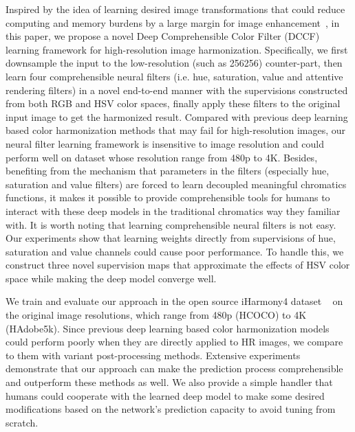 \documentclass[runningheads]{llncs}
\begin{document}
Inspired by the idea of learning desired image transformations that could reduce computing and memory burdens by a large margin for image enhancement~\cite{gharbi2017deep}, in this paper, 
    we propose a novel Deep Comprehensible Color Filter (DCCF) learning framework for high-resolution image harmonization.
    Specifically, we first downsample the input to the low-resolution (such as 256256) counter-part, then learn four comprehensible neural filters (i.e. hue, saturation, value and attentive rendering filters) in a novel end-to-end manner with the supervisions constructed from both RGB and HSV color spaces, finally apply these filters to the original input image to get the harmonized result.
    Compared with previous deep learning based color harmonization methods that may fail for high-resolution images, our neural filter learning framework is insensitive to image resolution and could perform well on dataset whose resolution range from 480p to 4K.
    Besides, benefiting from the mechanism that parameters in the filters (especially hue, saturation and value filters) are forced to learn decoupled meaningful chromatics functions, it makes it possible to
    provide comprehensible tools for humans to interact with these deep models in the traditional chromatics way they familiar with.
It is worth noting that learning comprehensible neural filters is not easy.
    Our experiments show that learning weights directly from supervisions of hue, saturation and value channels could cause poor performance.
    To handle this, we construct three novel supervision maps that approximate the effects of HSV color space while making the deep model converge well.


    We train and evaluate our approach in the open source iHarmony4 dataset ~\cite{cong2020dovenet} on the original image resolutions, which range from 480p (HCOCO) to 4K (HAdobe5k).
    Since previous deep learning based color harmonization models could perform poorly when they are directly applied to HR images, we compare to them with variant post-processing methods.
    Extensive experiments demonstrate that our approach can make the prediction process comprehensible and outperform these methods as well.
We also provide a simple handler that humans could cooperate with the learned deep model to make some desired modifications based on the network's prediction capacity to avoid tuning from scratch. 
    
\end{document}
